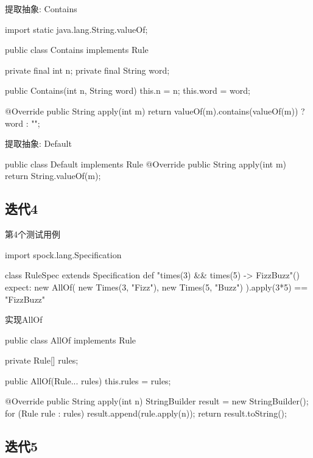 \begin{frame}[fragile]{提取抽象: Contains}
  \begin{java}
import static java.lang.String.valueOf;

public class Contains implements Rule {
  private final int n;
  private final String word;

  public Contains(int n, String word) {
    this.n = n;
    this.word = word;
  }

  @Override
  public String apply(int m) {
    return valueOf(m).contains(valueOf(m)) ? word : "";
  }
}  
  \end{java}
\end{frame}

\begin{frame}[fragile]{提取抽象: Default}
  \begin{java}
public class Default implements Rule {
  @Override
  public String apply(int m) {
    return String.valueOf(m);
  }
}  
  \end{java}
\end{frame}

\subsection{迭代4}

\begin{frame}[fragile]{第4个测试用例}
  \begin{scala}
import spock.lang.Specification

class RuleSpec extends Specification {
  def "times(3) && times(5) -> FizzBuzz"() {
    expect:
    new AllOf(
        new Times(3, "Fizz"),
        new Times(5, "Buzz")
    ).apply(3*5) == "FizzBuzz"
  }
}
  \end{scala}
\end{frame}

\begin{frame}[fragile]{实现AllOf}
  \begin{java}
public class AllOf implements Rule {
  private Rule[] rules;

  public AllOf(Rule... rules) {
    this.rules = rules;
  }

  @Override
  public String apply(int n) {
    StringBuilder result = new StringBuilder();
    for (Rule rule : rules) {
      result.append(rule.apply(n));
    }
    return result.toString();
  }
}
  \end{java}
\end{frame}

\subsection{迭代5}

